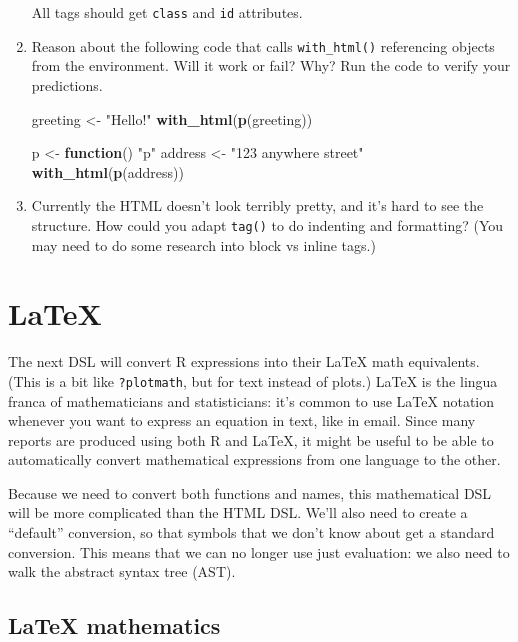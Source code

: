 \documentclass[]{book}
\newenvironment{Shaded}{\begin{snugshade}}{\end{snugshade}}
\newcommand{\ControlFlowTok}[1]{\textcolor[rgb]{0.27,0.27,0.27}{\textbf{#1}}}
\newcommand{\KeywordTok}[1]{\textcolor[rgb]{0.27,0.27,0.27}{\textbf{#1}}}
\newcommand{\NormalTok}[1]{#1}
\newcommand{\StringTok}[1]{\textcolor[rgb]{0.5,0.5,0.5}{#1}}
\begin{document}
\begin{enumerate}
  All tags should get \texttt{class} and \texttt{id} attributes.
\item
  Reason about the following code that calls \texttt{with\_html()} referencing objects
  from the environment. Will it work or fail? Why? Run the code to
  verify your predictions.

\begin{Shaded}
\begin{Highlighting}[]
\NormalTok{greeting <-}\StringTok{ "Hello!"}
\KeywordTok{with_html}\NormalTok{(}\KeywordTok{p}\NormalTok{(greeting))}

\NormalTok{p <-}\StringTok{ }\ControlFlowTok{function}\NormalTok{() }\StringTok{"p"}
\NormalTok{address <-}\StringTok{ "123 anywhere street"}
\KeywordTok{with_html}\NormalTok{(}\KeywordTok{p}\NormalTok{(address))}
\end{Highlighting}
\end{Shaded}
\item
  Currently the HTML doesn't look terribly pretty, and it's hard to see the
  structure. How could you adapt \texttt{tag()} to do indenting and formatting?
  (You may need to do some research into block vs inline tags.)
\end{enumerate}

\hypertarget{latex}{%
\section{LaTeX}\label{latex}}


The next DSL will convert R expressions into their LaTeX math equivalents. (This is a bit like \texttt{?plotmath}, but for text instead of plots.) LaTeX is the lingua franca of mathematicians and statisticians: it's common to use LaTeX notation whenever you want to express an equation in text, like in email. Since many reports are produced using both R and LaTeX, it might be useful to be able to automatically convert mathematical expressions from one language to the other.

Because we need to convert both functions and names, this mathematical DSL will be more complicated than the HTML DSL. We'll also need to create a ``default'' conversion, so that symbols that we don't know about get a standard conversion. This means that we can no longer use just evaluation: we also need to walk the abstract syntax tree (AST).

\hypertarget{latex-mathematics}{%
\subsection{LaTeX mathematics}\label{latex-mathematics}}
\end{document}
